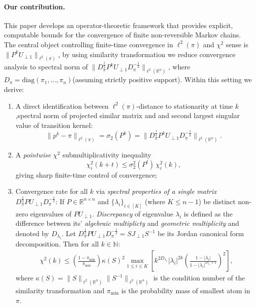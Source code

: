 \documentclass[preprint]{imsart}
\theoremstyle{plain}
\theoremstyle{definition}
\begin{document}
\paragraph{Our contribution.}
This paper develops an operator-theoretic framework that provides explicit, computable bounds for the convergence of finite non-reversible Markov chains.  
The central object controlling finite-time convergence in $\ell^{2}(\pi)$ and $\chi^{2}$ sense is $\|P^{k} U_{\perp 1}\|_{\ell^{2}(\pi)}$, by using similarity transformation we reduce convergence analysis to spectral norm of $\|D_{\pi}^{\tfrac{1}{2}}P^{k}U_{\perp 1}D_{\pi}^{-\tfrac{1}{2}}\|_{\ell^{2}(\mathbb{R}^{n})}$, where $D_{\pi}=\mathrm{diag}(\pi_{1},\ldots,\pi_{n})$(assuming strictly positive support).
Within this setting we derive:
\begin{enumerate}
  \item A direct identification between $\ell^{2}(\pi)$-distance to stationarity at time $k$,spectral norm of projected similar matrix and and second largest singular value of transition kernel:
  \[\|p^{k}-\pi\|_{\ell^{2}(\pi)}=\sigma_{2}(P^{k})=\|D_{\pi}^{\tfrac{1}{2}}P^{k}U_{\perp 1}D_{\pi}^{-\tfrac{1}{2}}\|_{\ell^{2}(\mathbb{R}^{n})}.\]
  \item A \emph{pointwise} $\chi^{2}$ submultiplicativity inequality 
        \[
        \chi^{2}_{i}(k+t)\leq \sigma_{2}^{2}(P^{t})\,\chi^{2}_{i}(k),
        \]
        giving sharp finite-time control of convergence;
  \item Convergence rate for all $k$ via \emph{spectral properties of a single matrix} $D_{\pi}^{\tfrac{1}{2}}PU_{\perp 1}D_{\pi}^{-\tfrac{1}{2}}$: If $P \in \mathbb{R}^{n \times n}$ and $\{\lambda_{i}\}_{i \in [K]}$ (where $K\leq n-1$) be distinct non-zero eigenvalues of $PU_{\perp 1}$. \emph{Discrepancy} of eigenvalue $\lambda_{i}$ is defined as the difference between its' \emph{algebraic multiplicty} and \emph{geometric multiplicity} and denoted by $D_{\lambda_{i}}$. Let $D_{\pi}^{\frac{1}{2}}PU_{\perp1}D_{\pi}^{-\frac{1}{2}}=SJ_{\perp1}S^{-1}$ be its Jordan canonical form decomposition. Then for all $k \in \mathbb{N}$:
    \begin{align}
        & \nonumber\chi^{2}(k) \leq \left(\frac{1-\pi_{\min}}{\pi_{\min}}\right) \kappa(S)^2 \max_{1 \leq i \leq K} \left[ k^{2D_{\lambda_{i}}} |\lambda_{i}|^{2k} \left( \frac{1-|\lambda_{i}|}{1-|\lambda_{i}|^{D_{\lambda_{i}}+1}}\right)^{2} \right],
    \end{align}
    where $\kappa(S) = \|S\|_{\ell^{2}(\mathbb{R}^{n})}\|S^{-1}\|_{\ell^{2}(\mathbb{R}^{n})}$ is the condition number of the similarity transformation and $\pi_{\min}$ is the probability mass of smallest atom in $\pi$.       

\end{enumerate}
\end{document}
